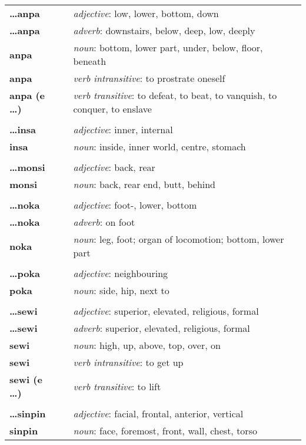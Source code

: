 \begin{supertabular}{p{2,5cm}|ll}
\textbf{\dots anpa} && \textit{adjective}: low, lower, bottom, down \\ %
\textbf{\dots anpa} && \textit{adverb}: downstairs, below, deep, low, deeply \\ %
\textbf{anpa} && \textit{noun}: bottom, lower part, under, below, floor, beneath \\ %
\textbf{anpa} && \textit{verb intransitive}: to prostrate oneself \\ %
\textbf{anpa (e \dots)} && \textit{verb transitive}: to defeat, to beat, to vanquish, to conquer, to enslave \\ %
 && \\ %
\textbf{\dots insa} && \textit{adjective}: inner, internal \\ %
\textbf{insa} && \textit{noun}: inside, inner world, centre, stomach \\ %
 && \\ %
\textbf{\dots monsi} && \textit{adjective}: back, rear \\ %
\textbf{monsi} && \textit{noun}: back, rear end, butt, behind \\ %
 && \\ %
\textbf{\dots noka} && \textit{adjective}: foot-, lower, bottom \\  %
\textbf{ \dots noka } && \textit{adverb}: on foot \\  %
\textbf{noka} && \textit{noun}: leg, foot; organ of locomotion; bottom, lower part \\ %
 && \\ %
\textbf{\dots poka} && \textit{adjective}: neighbouring \\ %
\textbf{poka} && \textit{noun}: side, hip, next to \\ %
 && \\ %
\textbf{\dots sewi} && \textit{adjective}: superior, elevated, religious, formal \\ %
\textbf{\dots sewi} && \textit{adverb}: superior, elevated, religious, formal \\ %
\textbf{sewi} && \textit{noun}: high, up, above, top, over, on \\ %
\textbf{sewi} && \textit{verb intransitive}: to get up \\ %
\textbf{sewi (e \dots)} && \textit{verb transitive}: to lift \\ %
 && \\ %
\textbf{\dots sinpin} && \textit{adjective}: facial, frontal, anterior, vertical \\ %
\textbf{sinpin} && \textit{noun}: face, foremost, front, wall, chest, torso \\ %
\end{supertabular} \\
